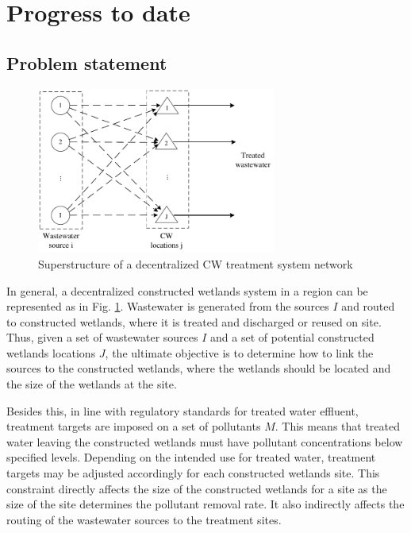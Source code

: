 \documentclass[preprint,12pt,authoryear]{elsarticle}
\begin{document}
\section{Progress to date}\label{section:progress}
\subsection{Problem statement}\label{section:problemstatement}

\begin{figure}[!htpb]
	\centering
	\includegraphics[width=0.7\textwidth]{CWnetwork.pdf}
	\caption{Superstructure of a decentralized CW treatment system network}
	\label{fig:network}
\end{figure}

In general, a decentralized constructed wetlands system in a region can be represented as in Fig. \ref{fig:network}. Wastewater is generated from the sources $I$ and routed to constructed wetlands, where it is treated and discharged or reused on site. Thus, given a set of wastewater sources $I$ and a set of potential constructed wetlands locations $J$, the ultimate objective is to determine how to link the sources to the constructed wetlands, where the wetlands should be located and the size of the wetlands at the site. 

Besides this, in line with regulatory standards for treated water effluent, treatment targets are imposed on a set of pollutants $M$. This means that treated water leaving the constructed wetlands must have pollutant concentrations below specified levels. Depending on the intended use for treated water, treatment targets may be adjusted accordingly for each constructed wetlands site. This constraint directly affects the size of the constructed wetlands for a site as the size of the site determines the pollutant removal rate. It also indirectly affects the routing of the wastewater sources to the treatment sites. 
\end{document}

